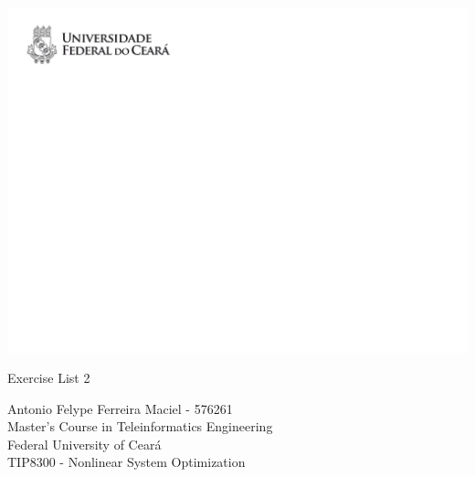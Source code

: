 \documentclass[11pt,a4paper]{article}
\begin{document}
\thispagestyle{empty}

\begin{flushleft} \includegraphics[width=1.0\textwidth]{headers}   \end{flushleft}

\vskip0.5cm
\begin{spacing}{2} {\Large\sc\noindent Exercise List 2}
\end{spacing}

\vfill

\begin{spacing}{1.2}
{\large\sc  Antonio Felype Ferreira Maciel - 576261}\\

{\noindent \large \sc Master's Course in Teleinformatics Engineering}\\
{\noindent \large \sc Federal University of Ceará}\\

{\noindent \large \sc TIP8300 - Nonlinear System Optimization}
\end{spacing}

\newpage 


\newpage

\end{document}
